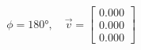 \documentclass[preview]{standalone}
\begin{document}
\begin{align*}
\phi = 180°, \quad \vec{v} = \begin{bmatrix} 0.000 \\ 0.000 \\ 0.000 \end{bmatrix}
\end{align*}
\end{document}
